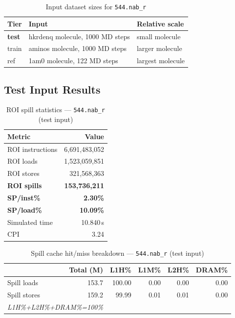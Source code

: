 \documentclass[11pt,a4paper]{article}
\begin{document}
\begin{table}[H]
\centering
\caption{Input dataset sizes for \texttt{544.nab\_r}}
\label{tab:nab_inputs}
\small
\begin{tabular}{lp{8cm}l}
\toprule
\textbf{Tier} & \textbf{Input} & \textbf{Relative scale} \\
\midrule
\textbf{test} & hkrdenq molecule, 1000 MD steps & small molecule \\
train & aminos molecule, 1000 MD steps & larger molecule \\
ref & 1am0 molecule, 122 MD steps & largest molecule \\
\bottomrule
\end{tabular}
\end{table}

\subsection{Test Input Results}

\begin{table}[H]
\centering
\caption{ROI spill statistics --- \texttt{544.nab\_r} (test input)}
\label{tab:nab_test_roi}
\begin{tabular}{lr}
\toprule
\textbf{Metric} & \textbf{Value} \\
\midrule
ROI instructions & 6,691,483,052 \\
ROI loads        & 1,523,059,851 \\
ROI stores       & 321,568,363 \\
\textbf{ROI spills}   & \textbf{153,736,211} \\
\textbf{SP/inst\%}   & \textbf{2.30\%} \\
\textbf{SP/load\%}   & \textbf{10.09\%} \\
Simulated time   & 10.840\,s \\
CPI              & 3.24 \\
\bottomrule
\end{tabular}
\end{table}

\begin{table}[H]
\centering
\caption{Spill cache hit/miss breakdown --- \texttt{544.nab\_r} (test input)}
\label{tab:nab_test_cache}
\begin{tabular}{lrrrrr}
\toprule
\textbf{} & \textbf{Total (M)} & \textbf{L1H\%} & \textbf{L1M\%} & \textbf{L2H\%} & \textbf{DRAM\%} \\
\midrule
Spill loads  & 153.7 & 100.00 & 0.00 & 0.00 & 0.00 \\
Spill stores & 159.2 & 99.99 & 0.01 & 0.01 & 0.00 \\
\multicolumn{2}{l}{\small\textit{L1H\%+L2H\%+DRAM\%=100\%}} \\
\bottomrule
\end{tabular}
\end{table}
\end{document}
